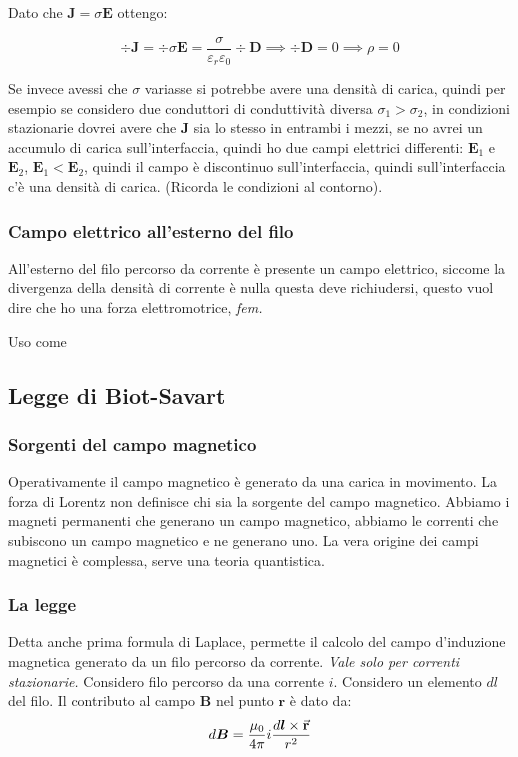 \documentclass[a4paper]{scrarticle}
\begin{document}
Dato che $\bm J = \sigma \bm E$ ottengo:

\begin{equation*}
    \div \bm J  = \div \sigma \bm E = \frac{\sigma}{\varepsilon_r\varepsilon_0} \div \bm D \implies \div \bm D = 0 \implies \rho = 0
\end{equation*}

Se invece avessi che $\sigma$ variasse si potrebbe avere una densità di carica, quindi per esempio se considero due conduttori di conduttività diversa $\sigma_1 > \sigma_2$, in condizioni stazionarie dovrei avere che $\bm J$ sia lo stesso in entrambi i mezzi, se no avrei un accumulo di carica sull'interfaccia, quindi ho due campi elettrici differenti: $\bm E_1$ e $\bm E_2$, $\bm E_1 < \bm E_2$, quindi il campo è discontinuo sull'interfaccia, quindi sull'interfaccia c'è una densità di carica. (Ricorda le condizioni al contorno).

\subsubsection*{Campo elettrico all'esterno del filo}

All'esterno del filo percorso da corrente è presente un campo elettrico, siccome la divergenza della densità di corrente è nulla questa deve richiudersi, questo vuol dire che ho una forza elettromotrice, \emph{fem.}

Uso come 

\subsection{Legge di Biot-Savart}
\subsubsection*{Sorgenti del campo magnetico}

Operativamente il campo magnetico è generato da una carica in movimento. La forza di Lorentz non definisce chi sia la sorgente del campo magnetico. Abbiamo i magneti permanenti che generano un campo magnetico, abbiamo le correnti che subiscono un campo magnetico e ne generano uno. La vera origine dei campi magnetici è complessa, serve una teoria quantistica.

\subsubsection*{La legge}

Detta anche prima formula di Laplace, permette il calcolo del campo d'induzione magnetica generato da un filo percorso da corrente. \emph{Vale solo per correnti stazionarie.} 
Considero filo percorso da una corrente $i$. Considero un elemento $dl$ del filo. Il contributo al campo $\bm B$ nel punto $\bm r$ è dato da:
\begin{equation}
d \bm B = \frac{\mu_0}{4\pi}i \frac{d \bm l \times \va r}{r^2}
\end{equation}
\end{document}
